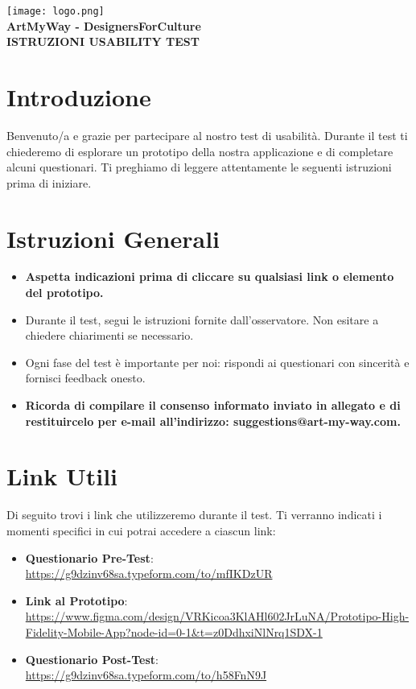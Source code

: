 \documentclass{article}
\begin{document}
\begin{center}
    \texttt{[image: logo.png]} \\[1em]
    {\LARGE \textbf{ArtMyWay - DesignersForCulture}} \\[0.5em]
    {\Large \textbf{ISTRUZIONI USABILITY TEST}} \\[1.5em]
\end{center}

\section{Introduzione}
Benvenuto/a e grazie per partecipare al nostro test di usabilit\`a. Durante il test ti chiederemo di esplorare un prototipo della nostra applicazione e di completare alcuni questionari.
Ti preghiamo di leggere attentamente le seguenti istruzioni prima di iniziare.

\section{Istruzioni Generali}
\begin{itemize}
    \item \textbf{Aspetta indicazioni prima di cliccare su qualsiasi link o elemento del prototipo.}
    \item Durante il test, segui le istruzioni fornite dall'osservatore. Non esitare a chiedere chiarimenti se necessario.
    \item Ogni fase del test \`e importante per noi: rispondi ai questionari con sincerit\`a e fornisci feedback onesto.
    \item \textbf{Ricorda di compilare il consenso informato inviato in allegato e di restituircelo per e-mail all'indirizzo: suggestions@art-my-way.com.}
\end{itemize}

\section{Link Utili}
Di seguito trovi i link che utilizzeremo durante il test. Ti verranno indicati i momenti specifici in cui potrai accedere a ciascun link:

\begin{itemize}
    \item \textbf{Questionario Pre-Test}: \\ \url{https://g9dzinv68sa.typeform.com/to/mfIKDzUR}
    \item \textbf{Link al Prototipo}: \\ \url{https://www.figma.com/design/VRKicoa3KlAHl602JrLuNA/Prototipo-High-Fidelity-Mobile-App?node-id=0-1&t=z0DdhxiNlNrq1SDX-1}
    \item \textbf{Questionario Post-Test}: \\ \url{https://g9dzinv68sa.typeform.com/to/h58FnN9J}
\end{itemize}
\end{document}
